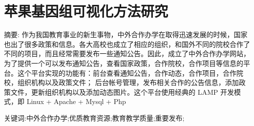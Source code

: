 \chapter*{苹果基因组可视化方法研究}
\vspace{1em}
{\large {\heiti 摘要: }}\normalsize{\songti 作为我国教育事业的新生事物，中外合作办学在取得迅速发展的时候，国家也出了很多政策和信息。各大高校也成立了相应的组织，和国外不同的院校合作了不同的项目，而且经常需要发布一些通知公告。因此，成立了中外合作办学网站，为了提供一个可以发布通知公告，查看国家政策，合作院校，合作项目等信息的平台。这个平台实现的功能有：前台查看通知公告，合作动态，合作项目，合作院校，组织机构以及政策文件； 后台帐号管理，发布相关合作的公告信息，添加政策文件，更新组织机构以及添加动态图片。这个平台使用经典的 LAMP 开发模式，即 Linux + Apache + Mysql + Php}

{\large {\heiti 关键词:}}\normalsize{中外合作办学;优质教育资源;教育教学质量;重要发布;}
\thispagestyle{empty}